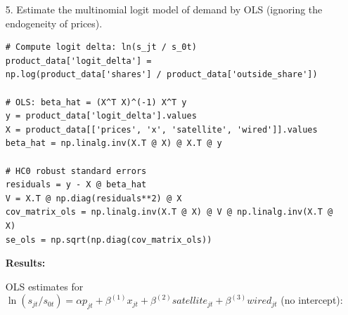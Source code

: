 \documentclass[english,11pt]{article}
\begin{document}
\begin{enumerate}
\item[5.] Estimate the multinomial logit model of demand by OLS
(ignoring the endogeneity of prices). \begin{verbatim}
# Compute logit delta: ln(s_jt / s_0t)
product_data['logit_delta'] =
np.log(product_data['shares'] / product_data['outside_share'])

# OLS: beta_hat = (X^T X)^(-1) X^T y
y = product_data['logit_delta'].values
X = product_data[['prices', 'x', 'satellite', 'wired']].values
beta_hat = np.linalg.inv(X.T @ X) @ X.T @ y

# HC0 robust standard errors
residuals = y - X @ beta_hat
V = X.T @ np.diag(residuals**2) @ X
cov_matrix_ols = np.linalg.inv(X.T @ X) @ V @ np.linalg.inv(X.T @ X)
se_ols = np.sqrt(np.diag(cov_matrix_ols))
\end{verbatim}

\textbf{Results:}

OLS estimates for $\ln(s_{jt}/s_{0t}) = \alpha p_{jt} + \beta^{(1)} x_{jt} + \beta^{(2)} satellite_{jt} + \beta^{(3)} wired_{jt}$ (no intercept):


\end{enumerate}
\end{document}
